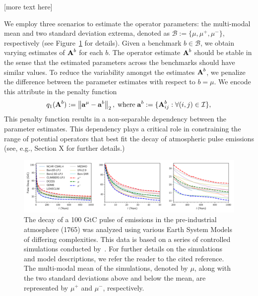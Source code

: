 \documentclass[11pt, a4paper, pdftex, twoside, dvipsnames]{article}
\renewcommand{\ref}{\cref}
\newcommand{\bb}[1]{\boldsymbol{\bold{#1}}}
\begin{document}
[more text here]
\newpage

We employ three scenarios to estimate the operator parameters: the multi-modal mean and two standard deviation extrema, denoted as $\mathcal{B}:=\{\mu,\mu^+,\mu^-\}$, respectively (see Figure~\ref{fig:2} for details). 
Given a benchmark $b \in \mathcal{B}$, we obtain varying estimates of $\bb{A}^{b}$ for each $b$. 
The operator estimate $\bb{A}^{b}$ should be stable in the sense that the estimated parameters across the benchmarks should have similar values.
To reduce the variability amongst the estimates $\bb{A}^{b}$, we penalize the difference between the parameter estimates with respect to $b=\mu$.
We encode this attribute in the penalty function 
%
\begin{align}\label{eq:clim_model.6}
	q_1(\bb{A}^b) := \left \| \bb{a}^\mu - \bb{a}^b \right \|_2 ,\; \text{where} \; \bb{a}^b:= \{\bb{A}^b_{ij}: \forall (i,j) \in \mathcal{I}      \},
\end{align}
%
This penalty function results in a non-separable dependency between the parameter estimates. 
This dependency plays a critical role in constraining the range of potential operators that best fit the decay of atmospheric pulse emissions (see, e.g., Section X for further details.)
\begin{figure}[t]
    \centering
    \includegraphics[width=\textwidth]{fig/pulse.png}
    \caption{
    The decay of a 100 GtC pulse of emissions in the pre-industrial atmosphere (1765) was analyzed using various Earth System Models of differing complexities.
    This data is based on a series of controlled simulations conducted by~\cite{joos2013carbon}.
    For further details on the simulations and model descriptions, we refer the reader to the cited reference. The multi-modal mean of the simulations, denoted by $\mu$, along with the two standard deviations above and below the mean, are represented by $\mu^+$ and $\mu^-$, respectively.
     }
    \label{fig:2}
\end{figure}
\end{document}
